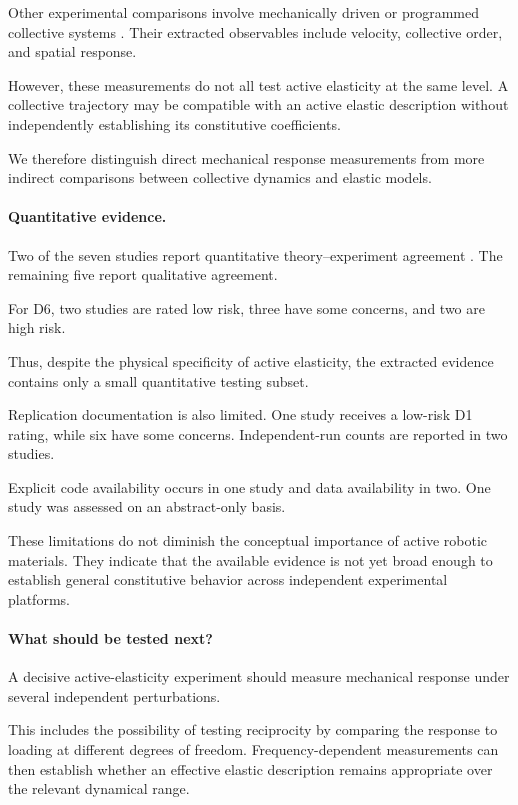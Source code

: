 Other experimental comparisons
involve mechanically driven
or programmed collective
systems
\cite{Mohanty2025multimodalmotionan,nr2022mindthegappredic,Karagzel2024selforganizedflock}.
Their extracted observables
include velocity,
collective order,
and spatial response.

However, these measurements
do not all test
active elasticity
at the same level.
A collective trajectory
may be compatible
with an active
elastic description
without independently
establishing its
constitutive coefficients.

We therefore distinguish
direct mechanical
response measurements
from more indirect
comparisons between
collective dynamics
and elastic models.

\paragraph*{Quantitative evidence.}

Two of the seven studies
report quantitative
theory--experiment agreement
\cite{Brandenbourger2021limitcyclesturnac,Chen2020selfsensingmetamat}.
The remaining five
report qualitative agreement.

For D6, two studies
are rated low risk,
three have some concerns,
and two are high risk.

Thus, despite the
physical specificity
of active elasticity,
the extracted evidence
contains only a
small quantitative
testing subset.

Replication documentation
is also limited.
One study receives
a low-risk D1 rating,
while six have
some concerns.
Independent-run counts
are reported in
two studies.

Explicit code availability
occurs in one study
and data availability
in two. One study
was assessed on
an abstract-only basis.

These limitations
do not diminish
the conceptual
importance of
active robotic
materials. They
indicate that the
available evidence
is not yet broad
enough to establish
general constitutive
behavior across
independent
experimental platforms.

\paragraph*{What should be tested next?}

A decisive active-elasticity
experiment should measure
mechanical response under
several independent
perturbations.

This includes the
possibility of
testing reciprocity
by comparing the
response to loading
at different
degrees of freedom.
Frequency-dependent
measurements can
then establish
whether an effective
elastic description
remains appropriate
over the relevant
dynamical range.

